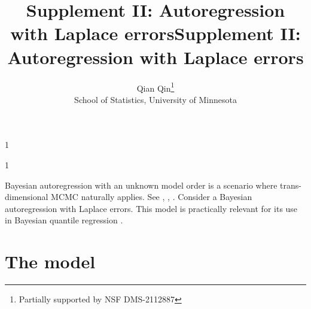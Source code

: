 \documentclass[12pt]{article}
\newcommand{\blind}{1}
\begin{document}
	
	
	\def\spacingset#1{\renewcommand{\baselinestretch}%
		{#1}\small\normalsize} \spacingset{1}
	
	
	
	\blind
	{
		\title{\bf Supplement II: Autoregression with Laplace errors}
		\author{}
		\maketitle
	} \fi
	
	\blind
	{
		\title{\bf Supplement II: Autoregression with Laplace errors}
		\author{Qian Qin\thanks{
				Partially supported by NSF DMS-2112887}\hspace{.2cm}\\
			School of Statistics, University of Minnesota}
		\maketitle
	} \fi

	\maketitle
	
	\spacingset{1.9} %
	
	
	
	\renewcommand*{\thetheorem}{\alph{theorem}}
	\def\theequation{\alphalph{\value{equation}}}
	\def\thefigure{\alphalph{\value{figure}}}
	\def\thetable{\alphalph{\value{table}}}
	\def\thesection{\alphalph{\value{section}}}
	
	Bayesian autoregression with an unknown model order is a scenario where trans-dimensional MCMC naturally applies.
	See \cite{troughton1998reversible}, \cite{ehlers2002efficient}, \cite{vermaak2004reversible}.
	Consider a Bayesian autoregression with Laplace errors.
	This model is practically relevant for its use in Bayesian quantile regression \citep{yu2001bayesian}.
	
	
	\section{The model}
	
	
	
\end{document}
